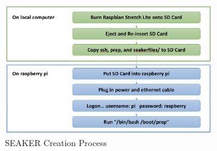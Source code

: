 \documentclass[12pt]{article}
\begin{document}
  \begin{figure}[ht]
    \centering
      \includegraphics[width=0.8\textwidth]{images/SeakerCreation.png}
    \caption{SEAKER Creation Process}\label{fig:SeakerCreation}
  \end{figure}

\newpage
\end{document}

